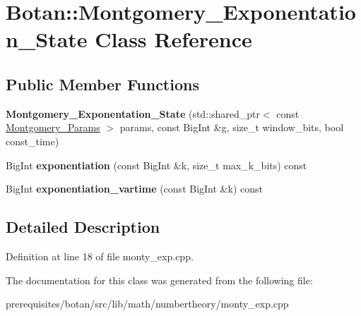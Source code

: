 \hypertarget{class_botan_1_1_montgomery___exponentation___state}{}\section{Botan\+:\+:Montgomery\+\_\+\+Exponentation\+\_\+\+State Class Reference}
\label{class_botan_1_1_montgomery___exponentation___state}
\subsection*{Public Member Functions}
\begin{DoxyCompactItemize}
\item 
\mbox{\label{class_botan_1_1_montgomery___exponentation___state_ae358a576470491e370b480552c145e21}} 
{\bfseries Montgomery\+\_\+\+Exponentation\+\_\+\+State} (std\+::shared\+\_\+ptr$<$ const \mbox{\hyperlink{class_botan_1_1_montgomery___params}{Montgomery\+\_\+\+Params}} $>$ params, const Big\+Int \&g, size\+\_\+t window\+\_\+bits, bool const\+\_\+time)
\item 
\mbox{\label{class_botan_1_1_montgomery___exponentation___state_a17acc5078d22e34c38469c5b754364e9}} 
Big\+Int {\bfseries exponentiation} (const Big\+Int \&k, size\+\_\+t max\+\_\+k\+\_\+bits) const
\item 
\mbox{\label{class_botan_1_1_montgomery___exponentation___state_a242fc889c2e994b9d814ea05d47b9780}} 
Big\+Int {\bfseries exponentiation\+\_\+vartime} (const Big\+Int \&k) const
\end{DoxyCompactItemize}


\subsection{Detailed Description}


Definition at line 18 of file monty\+\_\+exp.\+cpp.



The documentation for this class was generated from the following file\+:\begin{DoxyCompactItemize}
\item 
prerequisites/botan/src/lib/math/numbertheory/monty\+\_\+exp.\+cpp\end{DoxyCompactItemize}
